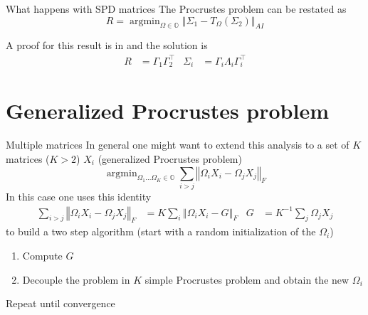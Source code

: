 \documentclass[xcolor=dvipsnames,aspectratio=169]{beamer}
\DeclareMathOperator*{\argmin}{argmin}
\newcommand{\norm}[2][]{\left\Vert#2\right\Vert_{#1}}
\begin{document}
    \begin{frame}[t]{What happens with SPD matrices}
        The Procrustes problem can be restated as
        \begin{equation*}
            R = \argmin_{\Omega\in\mathbb{O}}\norm[AI]{\Sigma_1 - T_\Omega(\Sigma_2)}
        \end{equation*}

        \pause
        A proof for this result is in \cite{bhatia_procrustes_2019} and the solution is
        \begin{align*}
            R &= \Gamma_1\Gamma_2^\intercal &   \Sigma_i &= \Gamma_i\Lambda_i\Gamma_i^\intercal
        \end{align*}

    \end{frame}

    \section{Generalized Procrustes problem}
    \begin{frame}[t]{Multiple matrices}
        In general one might want to extend this analysis to a set of $K$ matrices ($K>2$) $X_i$ (generalized Procrustes problem)
        \begin{equation*}
            \argmin_{\Omega_1\dots\Omega_K\in\mathbb{O}}\sum_{i>j}\norm[F]{\Omega_iX_i - \Omega_jX_j}
        \end{equation*}
        \pause
        In this case one uses this identity
        \begin{align*}
            \sum_{i>j}\norm[F]{\Omega_iX_i - \Omega_jX_j}  &= K\sum_i\norm[F]{\Omega_iX_i - G}  &   G &= K^{-1}\sum_j\Omega_jX_j
        \end{align*}
        to build a two step algorithm (start with a random initialization of the $\Omega_i$)
        \begin{enumerate}
            \item Compute $G$
            \item Decouple the problem in $K$ simple Procrustes problem and obtain the new $\Omega_i$
        \end{enumerate}
        Repeat until convergence

    \end{frame}
\end{document}

